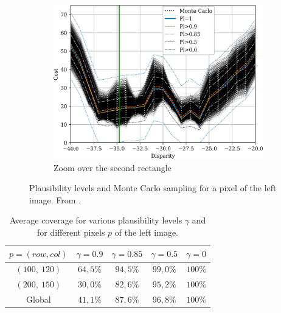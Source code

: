 \begin{figure}
\begin{subfigure}[t]{0.45\linewidth}
        \includegraphics[width=\linewidth]{Images/Chap_4/cost_curve_200_150_zoom2.png}
        \caption{Zoom over the second rectangle}
        \label{fig:montecarlo_gauss_200_150_zoom2}
    \end{subfigure}
    \caption{Plausibility levels and Monte Carlo sampling for a pixel of the left image.  From \cite{malinowski_uncertainty_2024}.}
    \label{fig:montecarlo_gauss_200_150}
\end{figure}

\begin{table}[ht]
\centering
\begin{tabular}{|c|c|c|c|c|}
\hline
\rowcolor[HTML]{C0C0C0}
$p=(row,col)$ & $\gamma=0.9$  & $\gamma=0.85$ & $\gamma=0.5$  & $\gamma=0$   \\ \hline
\cellcolor[HTML]{C0C0C0}$(100,~120)$     & $64,5\%$ & $94,5\%$ & $99,0\%$ & $100\%$ \\ \hline
\cellcolor[HTML]{C0C0C0}$(200,~150)$     & $30,0\%$ & $82,6\%$ & $95,2\%$ & $100\%$ \\ \hline
\cellcolor[HTML]{C0C0C0}Global        & $41,1\%$ & $87,6\%$ & $96,8\%$ & $100\%$ \\ \hline
\end{tabular}
\caption{Average coverage for various plausibility levels $\gamma$ and for different pixels $p$ of the left image.}\label{tab:Coverage}
\end{table}

